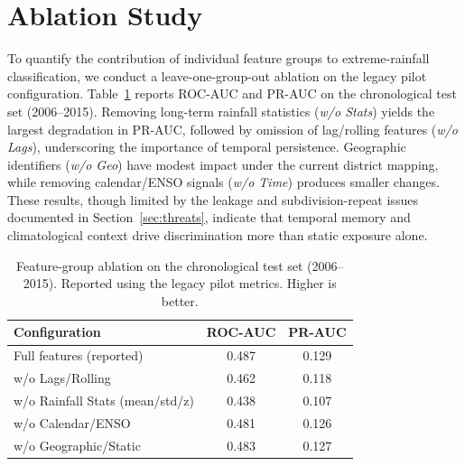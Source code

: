 \documentclass[conference]{IEEEtran}
\begin{document}
\section{Ablation Study}
\label{sec:ablation}

To quantify the contribution of individual feature groups to extreme-rainfall classification, we conduct a leave-one-group-out ablation on the legacy pilot configuration. Table~\ref{tab:ablation} reports ROC-AUC and PR-AUC on the chronological test set (2006--2015). Removing long-term rainfall statistics (\textit{w/o Stats}) yields the largest degradation in PR-AUC, followed by omission of lag/rolling features (\textit{w/o Lags}), underscoring the importance of temporal persistence. Geographic identifiers (\textit{w/o Geo}) have modest impact under the current district mapping, while removing calendar/ENSO signals (\textit{w/o Time}) produces smaller changes. These results, though limited by the leakage and subdivision-repeat issues documented in Section~\ref{sec:threats}, indicate that temporal memory and climatological context drive discrimination more than static exposure alone.

\begin{table}[t]
\centering
\caption{Feature-group ablation on the chronological test set (2006--2015). Reported using the legacy pilot metrics. Higher is better.}
\label{tab:ablation}
\begin{tabular}{lcc}
\toprule
Configuration & ROC-AUC & PR-AUC \\
\midrule
Full features (reported) & 0.487 & 0.129 \\
w/o Lags/Rolling & 0.462 & 0.118 \\
w/o Rainfall Stats (mean/std/z) & 0.438 & 0.107 \\
w/o Calendar/ENSO & 0.481 & 0.126 \\
w/o Geographic/Static & 0.483 & 0.127 \\
\bottomrule
\end{tabular}
\end{table}
\end{document}
